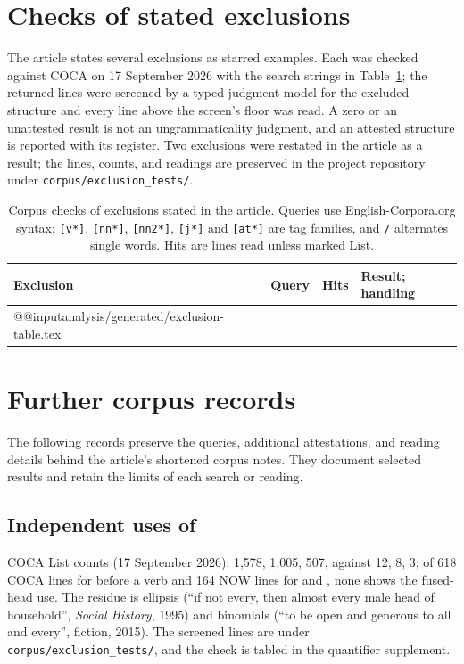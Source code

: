 \documentclass[12pt]{article}
\makeatletter
\newcommand{\tablebody}[1]{\csname @@input\endcsname #1 }
\makeatother
\begin{document}
\section{Checks of stated exclusions}

The article states several exclusions as starred examples. Each was checked against COCA on 17 September 2026 with the search strings in Table~\ref{tab:exclusion-checks}; the returned lines were screened by a typed-judgment model for the excluded structure and every line above the screen's floor was read. A zero or an unattested result is not an ungrammaticality judgment, and an attested structure is reported with its register. Two exclusions were restated in the article as a result; the lines, counts, and readings are preserved in the project repository under \texttt{corpus/exclusion\_tests/}.

\begin{table}[H]
\centering\small
\caption{Corpus checks of exclusions stated in the article. Queries use English-Corpora.org syntax; \texttt{[v*]}, \texttt{[nn*]}, \texttt{[nn2*]}, \texttt{[j*]} and \texttt{[at*]} are tag families, and \texttt{/} alternates single words. Hits are lines read unless marked List.}\label{tab:exclusion-checks}
\setlength{\tabcolsep}{3pt}
\begin{tabular}{>{\raggedright\arraybackslash}p{3.1cm}>{\raggedright\arraybackslash}p{3.3cm}>{\raggedright\arraybackslash}p{2.6cm}>{\raggedright\arraybackslash}p{5.2cm}}
\toprule
Exclusion & Query & Hits & Result; handling \\
\midrule
\tablebody{analysis/generated/exclusion-table.tex}
\bottomrule
\end{tabular}
\end{table}

\section{Further corpus records}

The following records preserve the queries, additional attestations, and reading details behind the article's shortened corpus notes. They document selected results and retain the limits of each search or reading.

\subsection{Independent uses of }

COCA List counts (17 September 2026):  1,578,  1,005,  507, against  12,  8,  3; of 618 COCA lines for  before a verb and 164 NOW lines for  and , none shows the fused-head use. The residue is ellipsis (\enquote{if not every, then almost every male head of household}, \textit{Social History}, 1995) and binomials (\enquote{to be open and generous to all and every}, fiction, 2015). The screened lines are under \texttt{corpus/exclusion\_tests/}, and the check is tabled in the quantifier supplement.
\end{document}
